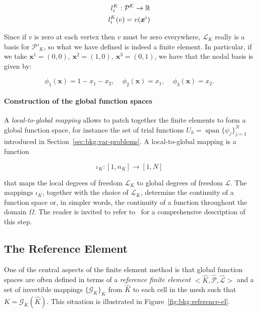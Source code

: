 \begin{equation}
\centering
\begin{split}
l_i^K : \mathcal{P^K} \rightarrow \mathbb{R} \\
l_i^K(v) = v(\boldsymbol{x}^i)
\end{split}
\end{equation}

Since if $v$ is zero at each vertex then $v$ must be zero everywhere, $\mathcal{L}_K$ really is a basis for $\mathcal{P}'_K$, so what we have defined is indeed a finite element. In particular, if we take $\boldsymbol{x}^1 = (0, 0),\ \boldsymbol{x}^2 = (1,0),\ \boldsymbol{x}^3 = (0,1)$, we have that the nodal basis is given by:

\begin{equation}
\phi_1(\boldsymbol{x}) = 1 - x_1 - x_2,\ \ \ \ \ \phi_2(\boldsymbol{x}) = x_1,\ \ \ \ \ \phi_3(\boldsymbol{x}) = x_2.
\end{equation}

\paragraph{Construction of the global function spaces}
A {\em local-to-global mapping} allows to patch together the finite elements to form a global function space, for instance the set of trial functions $U_h = \operatorname{span}\lbrace \psi_j \rbrace_{j=1}^N$ introduced in Section~\ref{sec:bkg:var-problems}. A local-to-global mapping is a function

\begin{equation}
\iota_K : [1,n_K] \rightarrow [1,N]
\end{equation}

that maps the local degrees of freedom $\mathcal{L}_K$ to global degrees of freedom $\mathcal{L}$. The mappings $\iota_K$, together with the choice of $\mathcal{L}_K$, determine the continuity of a function space or, in simpler words, the continuity of a function throughout the domain $\Omega$. The reader is invited to refer to~\cite{Fenics} for a comprehensive description of this step.

\subsection{The Reference Element}
\label{sec:bkg:refel}
One of the central aspects of the finite element method is that global function spaces are often defined in terms of a {\em reference finite element} ${<}\hat{K}, \hat{\mathcal{P}}, \hat{\mathcal{L}}{>}$ and a set of invertible mappings $\lbrace \mathcal{G}_K\rbrace_{K}$ from $\hat{K}$ to each cell in the mesh such that $K = \mathcal{G}_K(\hat{K})$.  This situation is illustrated in Figure~\ref{fig:bkg:reference-el}.

